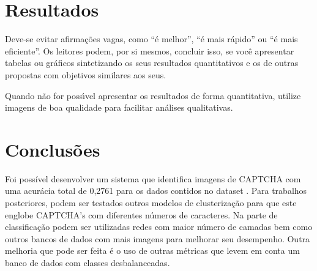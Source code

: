\documentclass[11pt]{article}
\begin{document}
\section{Resultados}

Deve-se evitar afirma\c{c}\~{o}es vagas, como ``\'{e} melhor'', ``\'{e} mais r\'{a}pido''
ou ``\'{e} mais eficiente''. Os leitores podem, por si mesmos, concluir isso,
se voc\^{e} apresentar tabelas ou gr\'{a}ficos sintetizando os seus resultados
quantitativos e os de outras propostas com objetivos similares aos
seus.

Quando n\~{a}o for poss\'{\i}vel apresentar os resultados de forma
quantitativa, utilize imagens de boa qualidade para facilitar an\'{a}lises
qualitativas.

\section{Conclus\~{o}es}

Foi possível desenvolver um sistema que identifica imagens de CAPTCHA com uma acurácia total de 0,2761 para os dados contidos no dataset \cite{data}. Para trabalhos posteriores, podem ser testados outros modelos de clusterização para que este englobe CAPTCHA’s com diferentes números de caracteres. Na parte de classificação podem ser utilizadas redes com maior número de camadas bem como outros bancos de dados com mais imagens para melhorar seu desempenho. Outra melhoria que pode ser feita é o uso de outras métricas que levem em conta um banco de dados com classes desbalanceadas.

  

   
\end{document}
